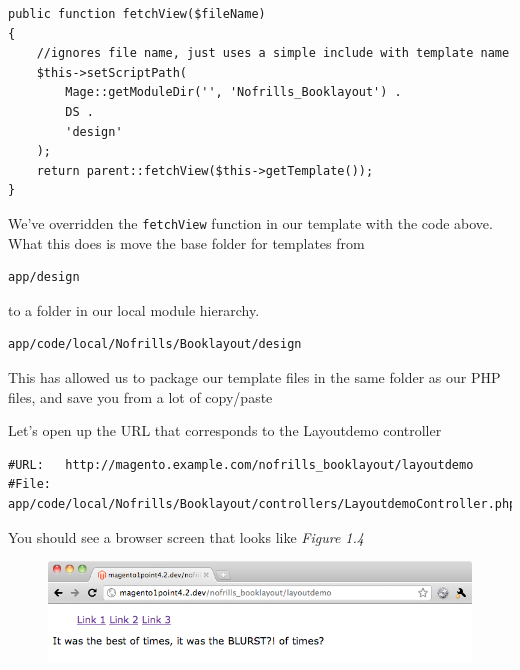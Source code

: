 \documentclass[oneside]{book}
\begin{document}
\begin{lstlisting}
public function fetchView($fileName)
{
    //ignores file name, just uses a simple include with template name
    $this->setScriptPath(
        Mage::getModuleDir('', 'Nofrills_Booklayout') .
        DS .
        'design'
    );
    return parent::fetchView($this->getTemplate());
}

\end{lstlisting}


We've overridden the \footnotesize\texttt{fetchView} \normalsize  function in our template with the code above.  What this does is move the base folder for templates from

\begin{lstlisting}
app/design

\end{lstlisting}


to a folder in our local module hierarchy.

\begin{lstlisting}
app/code/local/Nofrills/Booklayout/design

\end{lstlisting}


This has allowed us to package our template files in the same folder as our PHP files, and save you from a lot of copy/paste

Let's open up the URL that corresponds to the Layoutdemo controller

\begin{lstlisting}
#URL:   http://magento.example.com/nofrills_booklayout/layoutdemo
#File:  app/code/local/Nofrills/Booklayout/controllers/LayoutdemoController.php

\end{lstlisting}


You should see a browser screen that looks like \emph{Figure 1.4}

\begin{figure}[htb]
\begin{center}
\leavevmode
\includegraphics[width=1\textwidth]{images/chapter1/twocities.png}
\end{center}
\caption{}
\end{figure}
\end{document}
